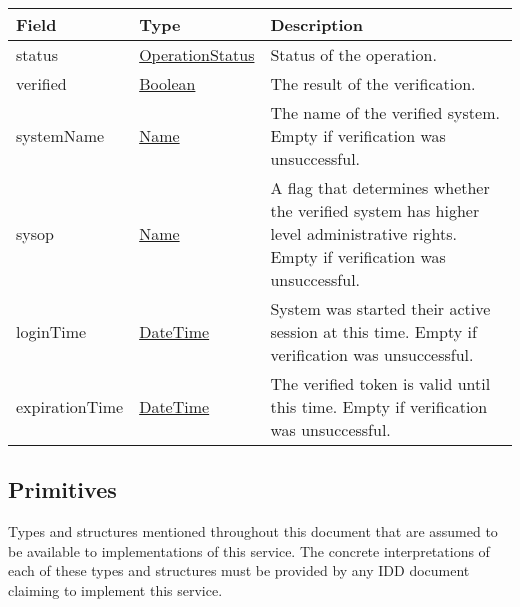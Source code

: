 \documentclass[a4paper]{arrowhead}
\newcommand{\pref}[1]{{\textcolor{ArrowheadGrey}{\hyperref[sec:model:primitives:#1]{#1}}}}
\begin{document}
 
\begin{table}[ht!]
\begin{tabularx}{\textwidth}{| p{4.25cm} | p{4cm} | X |} \hline
\rowcolor{gray!33} Field & Type      & Description \\ \hline
status & \pref{OperationStatus} & Status of the operation. \\ \hline
verified & \pref{Boolean} & The result of the verification. \\ \hline
systemName & \pref{Name} & The name of the verified system. Empty if verification was unsuccessful. \\ \hline
sysop & \pref{Name} & A flag that determines whether the verified system has higher level administrative rights. Empty if verification was unsuccessful. \\ \hline
loginTime & \pref{DateTime} & System was started their active session at this time. Empty if verification was unsuccessful. \\ \hline
expirationTime & \pref{DateTime} & The verified token is valid until this time. Empty if verification was unsuccessful. \\ \hline
\end{tabularx}
\end{table}

\subsection{Primitives}
\label{sec:model:primitives}

Types and structures mentioned throughout this document that are assumed to be available to implementations of this service.
The concrete interpretations of each of these types and structures must be provided by any IDD document claiming to implement this service.
\end{document}

